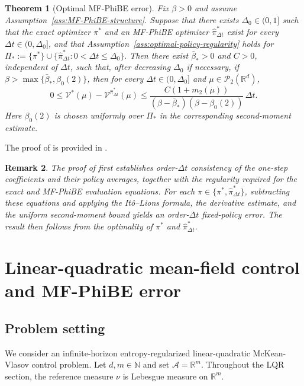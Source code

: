 \documentclass[a4paper, 10pt, english, reqno]{amsart}
\newtheorem{theorem}{Theorem}[section]
\newtheorem{remark}[theorem]{Remark}
\begin{document}
\begin{theorem}[Optimal MF-PhiBE error]
\label{thm:error_V_eval_optimal_pure_mkv}
Fix $\beta>0$ and assume Assumption~\ref{ass:MF-PhiBE-structure}. Suppose that there exists $\Delta_0\in(0,1]$ such that the exact optimizer $\pi^*$ and an MF-PhiBE optimizer $\hat\pi_{\Delta t}^*$ exist for every $\Delta t\in(0,\Delta_0]$, and that Assumption~\ref{ass:optimal-policy-regularity} holds for $\Pi_*:=\{\pi^*\}\cup \{\hat\pi_{\Delta t}^*:0<\Delta t\le\Delta_0\}.$ Then there exist $\bar\beta_*>0$ and $C>0$, independent of $\Delta t$, such that, after decreasing $\Delta_0$ if necessary, if $\beta>\max\{\bar\beta_*,\beta_0(2)\}$, then for every $\Delta t\in(0,\Delta_0]$ and $\mu\in\mathcal P_2(\mathbb R^d)$,
\begin{equation}
\label{eq:error_V_optimal_pure_mkv}
0\le
\mathcal V^*(\mu)-\mathcal V^{\hat\pi_{\Delta t}^*}(\mu)
\le
\frac{C(1+m_2(\mu))}
{(\beta-\bar\beta_*)(\beta-\beta_0(2))}\,\Delta t.
\end{equation}
Here $\beta_0(2)$ is chosen uniformly over $\Pi_*$ in the corresponding
second-moment estimate.
\end{theorem}
The proof of  is provided in .



\begin{remark}
The proof of  first establishes
order-$\Delta t$ consistency of the one-step coefficients and their
policy averages, together with the regularity required for the exact and
MF-PhiBE evaluation equations. For each
$\pi\in\{\pi^*,\hat\pi_{\Delta t}^*\}$, subtracting these equations and
applying the It\^o--Lions formula, the derivative estimate, and the
uniform second-moment bound yields an order-$\Delta t$ fixed-policy
error. The result then follows from the optimality of $\pi^*$ and
$\hat\pi_{\Delta t}^*$.
\end{remark}




\section{Linear-quadratic mean-field control and MF-PhiBE error}
\label{sec:LQR}
\subsection{Problem setting}
\label{subsec:LQR-model}

We consider an infinite-horizon entropy-regularized linear-quadratic McKean-Vlasov control problem. Let $d,m\in\mathbb N$ and set $\mathcal A=\mathbb R^m$. Throughout the LQR section, the reference measure $\nu$ is Lebesgue
measure on $\mathbb R^m$.
\end{document}
